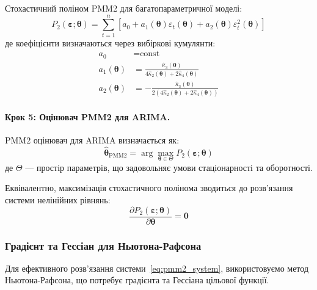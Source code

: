 \documentclass[12pt,a4paper]{article}
\begin{document}
	Стохастичний поліном PMM2 для багатопараметричної моделі:
	\begin{equation}
		\label{eq:pmm2_multivariate}
		P_2(\boldsymbol{\varepsilon}; \boldsymbol{\theta}) = \sum_{t=1}^{n} \left[ a_0 + a_1(\boldsymbol{\theta}) \varepsilon_t(\boldsymbol{\theta}) + a_2(\boldsymbol{\theta}) \varepsilon_t^2(\boldsymbol{\theta}) \right]
	\end{equation}
	де коефіцієнти визначаються через вибіркові кумулянти:
	\begin{align}
		a_0 &= \text{const} \label{eq:a0_arima} \\
		a_1(\boldsymbol{\theta}) &= \frac{\hat{\kappa}_3(\boldsymbol{\theta})}{4\hat{\kappa}_2(\boldsymbol{\theta}) + 2\hat{\kappa}_4(\boldsymbol{\theta})} \label{eq:a1_arima} \\
		a_2(\boldsymbol{\theta}) &= -\frac{\hat{\kappa}_3(\boldsymbol{\theta})}{2(4\hat{\kappa}_2(\boldsymbol{\theta}) + 2\hat{\kappa}_4(\boldsymbol{\theta}))} \label{eq:a2_arima}
	\end{align}
	
	\paragraph{Крок 5: Оцінювач PMM2 для ARIMA.}
	
	PMM2 оцінювач для ARIMA визначається як:
	\begin{equation}
		\label{eq:pmm2_arima_estimator}
		\hat{\boldsymbol{\theta}}_{\text{PMM2}} = \arg\max_{\boldsymbol{\theta} \in \Theta} P_2(\boldsymbol{\varepsilon}; \boldsymbol{\theta})
	\end{equation}
	де $\Theta$ --- простір параметрів, що задовольняє умови стаціонарності та оборотності.
	
	Еквівалентно, максимізація стохастичного полінома зводиться до розв'язання системи нелінійних рівнянь:
	\begin{equation}
		\label{eq:pmm2_system}
		\frac{\partial P_2(\boldsymbol{\varepsilon}; \boldsymbol{\theta})}{\partial \boldsymbol{\theta}} = \mathbf{0}
	\end{equation}
	
	\subsubsection{Градієнт та Гессіан для Ньютона-Рафсона}
	
	Для ефективного розв'язання системи~\eqref{eq:pmm2_system}, використовуємо метод Ньютона-Рафсона, що потребує градієнта та Гессіана цільової функції.
	
\end{document}

